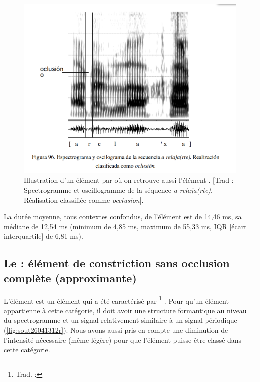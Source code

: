 \begin{figure}
	\centering
	\includegraphics[width=0.8\linewidth]{substance/spectro_images/blecua_figure96}
	\caption[Illustration d'un élément  par \textcite{blecuaVibrantesEspanolManifestaciones2002}]{Illustration d'un élément  par \textcite[238]{blecuaVibrantesEspanolManifestaciones2002} où on retrouve aussi l'élément . [Trad : Spectrogramme et oscillogramme de la séquence \textit{a relaja(rte)}. Réalisation classifiée comme \textit{occlusion}].}
	\label{fig:blecuafigure96}
\end{figure}

La durée moyenne, tous contextes confondus, de l'élément  est de 14,46 ms, sa médiane de 12,54 ms (minimum de 4,85 ms, maximum de 55,33 ms, IQR [écart interquartile] de 6,81 ms).\\



\subsection[Le \textg{a} : élément de constriction sans occlusion complète]{Le  : élément de constriction sans occlusion complète (approximante)}

L'élément  est un élément qui a été caractérisé par \footnote{Trad. : } \textcite[68]{blecuaVibrantesEspanolManifestaciones2002}. Pour qu'un élément appartienne à cette catégorie, il doit avoir une structure formantique au niveau du spectrogramme et un signal relativement similaire à un signal périodique (\autoref{fig:sout26041312r}). Nous avons aussi pris en compte une diminution de l'intensité nécessaire (même légère) pour que l'élément puisse être classé dans cette catégorie.

